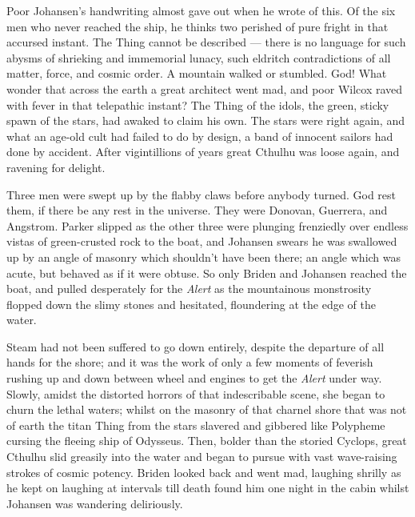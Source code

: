 \begin{pages}
\begin{Leftside}
Poor Johansen's handwriting almost gave out when he wrote of this. Of
the six men who never reached the ship, he thinks two perished of pure
fright in that accursed instant. The Thing cannot be described --- there
is no language for such abysms of shrieking and immemorial lunacy, such
eldritch contradictions of all matter, force, and cosmic order. A
mountain walked or stumbled. God! What wonder that across the earth a
great architect went mad, and poor Wilcox raved with fever in that
telepathic instant? The Thing of the idols, the green, sticky spawn of
the stars, had awaked to claim his own. The stars were right again, and
what an age-old cult had failed to do by design, a band of innocent
sailors had done by accident. After vigintillions of years great Cthulhu
was loose again, and ravening for delight.

Three men were swept up by the flabby claws before anybody turned. God
rest them, if there be any rest in the universe. They were Donovan,
Guerrera, and Angstrom. Parker slipped as the other three were plunging
frenziedly over endless vistas of green-crusted rock to the boat, and
Johansen swears he was swallowed up by an angle of masonry which
shouldn't have been there; an angle which was acute, but behaved as if
it were obtuse. So only Briden and Johansen reached the boat, and pulled
desperately for the \emph{Alert} as the mountainous monstrosity flopped down
the slimy stones and hesitated, floundering at the edge of the water.

Steam had not been suffered to go down entirely, despite the departure
of all hands for the shore; and it was the work of only a few moments of
feverish rushing up and down between wheel and engines to get the \emph{Alert}
under way. Slowly, amidst the distorted horrors of that indescribable
scene, she began to churn the lethal waters; whilst on the masonry of
that charnel shore that was not of earth the titan Thing from the stars
slavered and gibbered like Polypheme cursing the fleeing ship of
Odysseus. Then, bolder than the storied Cyclops, great Cthulhu slid
greasily into the water and began to pursue with vast wave-raising
strokes of cosmic potency. Briden looked back and went mad, laughing
shrilly as he kept on laughing at intervals till death found him one
night in the cabin whilst Johansen was wandering deliriously.


\end{Leftside}
\end{pages}
